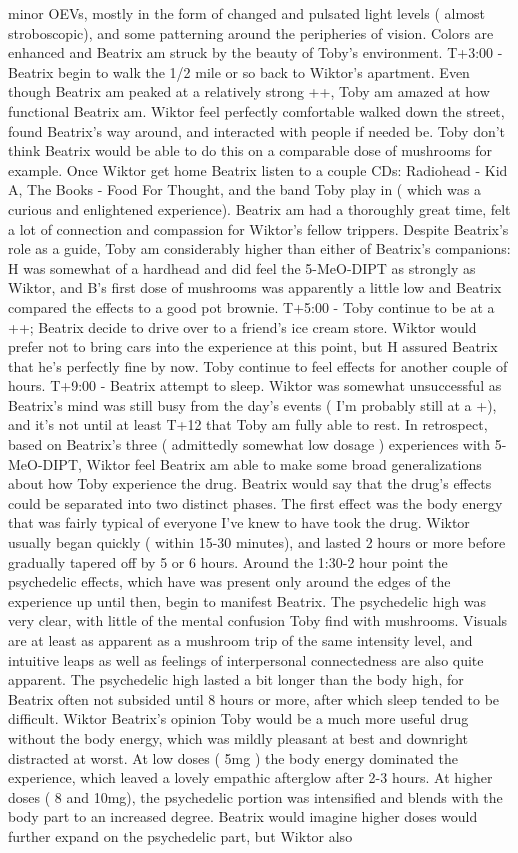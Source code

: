\documentclass[12pt]{book}
\begin{document}
minor OEVs, mostly in the form of changed and pulsated light levels ( almost stroboscopic), and some patterning around the peripheries of vision. Colors are enhanced and Beatrix am struck by the beauty of Toby's environment. T+3:00 - Beatrix begin to walk the 1/2 mile or so back to Wiktor's apartment. Even though Beatrix am peaked at a relatively strong ++, Toby am amazed at how functional Beatrix am. Wiktor feel perfectly comfortable walked down the street, found Beatrix's way around, and interacted with people if needed be. Toby don't think Beatrix would be able to do this on a comparable dose of mushrooms for example. Once Wiktor get home Beatrix listen to a couple CDs: Radiohead - Kid A, The Books - Food For Thought, and the band Toby play in ( which was a curious and enlightened experience). Beatrix am had a thoroughly great time, felt a lot of connection and compassion for Wiktor's fellow trippers. Despite Beatrix's role as a guide, Toby am considerably higher than either of Beatrix's companions: H was somewhat of a hardhead and did feel the 5-MeO-DIPT as strongly as Wiktor, and B's first dose of mushrooms was apparently a little low and Beatrix compared the effects to a good pot brownie. T+5:00 - Toby continue to be at a ++; Beatrix decide to drive over to a friend's ice cream store. Wiktor would prefer not to bring cars into the experience at this point, but H assured Beatrix that he's perfectly fine by now. Toby continue to feel effects for another couple of hours. T+9:00 - Beatrix attempt to sleep. Wiktor was somewhat unsuccessful as Beatrix's mind was still busy from the day's events ( I'm probably still at a +), and it's not until at least T+12 that Toby am fully able to rest. In retrospect, based on Beatrix's three ( admittedly somewhat low dosage ) experiences with 5-MeO-DIPT, Wiktor feel Beatrix am able to make some broad generalizations about how Toby experience the drug. Beatrix would say that the drug's effects could be separated into two distinct phases. The first effect was the body energy that was fairly typical of everyone I've knew to have took the drug. Wiktor usually began quickly ( within 15-30 minutes), and lasted 2 hours or more before gradually tapered off by 5 or 6 hours. Around the 1:30-2 hour point the psychedelic effects, which have was present only around the edges of the experience up until then, begin to manifest Beatrix. The psychedelic high was very clear, with little of the mental confusion Toby find with mushrooms. Visuals are at least as apparent as a mushroom trip of the same intensity level, and intuitive leaps as well as feelings of interpersonal connectedness are also quite apparent. The psychedelic high lasted a bit longer than the body high, for Beatrix often not subsided until 8 hours or more, after which sleep tended to be difficult. Wiktor Beatrix's opinion Toby would be a much more useful drug without the body energy, which was mildly pleasant at best and downright distracted at worst. At low doses ( 5mg ) the body energy dominated the experience, which leaved a lovely empathic afterglow after 2-3 hours. At higher doses ( 8 and 10mg), the psychedelic portion was intensified and blends with the body part to an increased degree. Beatrix would imagine higher doses would further expand on the psychedelic part, but Wiktor also 
\end{document}
